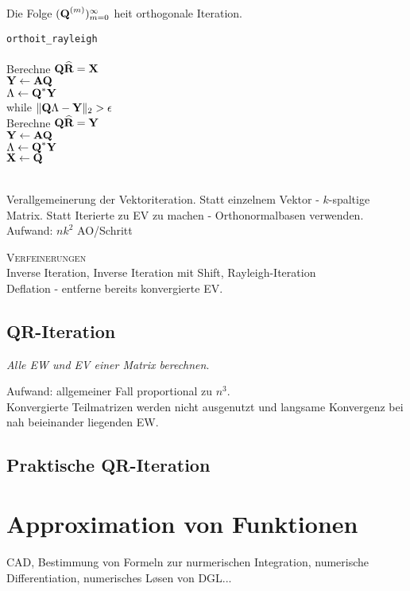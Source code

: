 Die Folge $(\mbox{\bf Q}^{(m)})_{m=0}^\infty$ hei\s t orthogonale Iteration.

\verb!orthoit_rayleigh!\\
{\addtolength{\leftskip}{0mm}
\hrulefill\\
Berechne $\mbox{\bf Q}\widehat{\mbox{\bf R}} = \mbox{\bf X}$ \\
$\mbox{\bf Y} \leftarrow \mbox{\bf AQ}$\\
$\mbox{\bf $\Lambda$} \leftarrow \mbox{\bf Q}^*\mbox{\bf Y}$ \\
while $\Vert \mbox{\bf Q$\Lambda$} - \mbox{\bf Y} \Vert_2 > \epsilon$ \\
\quad Berechne $\mbox{\bf Q}\widehat{\mbox{\bf R}} = \mbox{\bf Y}$ \\
\quad $\mbox{\bf Y} \leftarrow \mbox{\bf AQ}$\\
\quad $\mbox{\bf $\Lambda$} \leftarrow \mbox{\bf Q}^*\mbox{\bf Y}$ \\
$\mbox{\bf X} \leftarrow \mbox{\bf Q}$ \\
\hrulefill\\
}

Verallgemeinerung der Vektoriteration. Statt einzelnem Vektor - $k$-spaltige Matrix. Statt Iterierte zu EV zu machen - Orthonormalbasen verwenden.\\
Aufwand: $nk^2$ AO/Schritt

\textsc{Verfeinerungen}\\
Inverse Iteration, Inverse Iteration mit Shift, Rayleigh-Iteration\\
Deflation - entferne bereits konvergierte EV.

\subsection{QR-Iteration}
\emph{Alle EW und EV einer Matrix berechnen}.

Aufwand: allgemeiner Fall proportional zu $n^3$.\\
Konvergierte Teilmatrizen werden nicht ausgenutzt und langsame Konvergenz bei nah beieinander liegenden EW.

\subsection{Praktische QR-Iteration}


\section{Approximation von Funktionen}
CAD, Bestimmung von Formeln zur nurmerischen Integration, numerische Differentiation, numerisches L\o sen von DGL...

